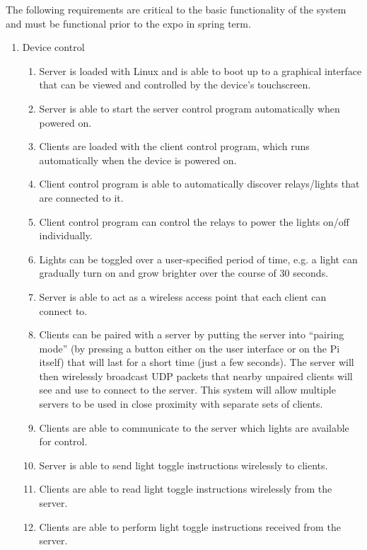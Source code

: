 \documentclass[12pt]{article}
\begin{document}
The following requirements are critical to the basic functionality of the
system and must be functional prior to the expo in spring term.

\begin{enumerate}
    \item Device control
        \begin{enumerate}
            \item Server is loaded with Linux and is able to boot up to a
                graphical interface that can be viewed and controlled by the
                device's touchscreen.
            \item Server is able to start the server control program
                automatically when powered on.
            \item Clients are loaded with the client control program, which
                runs automatically when the device is powered on.
            \item Client control program is able to automatically discover
                relays/lights that are connected to it.
            \item Client control program can control the relays to power the
                lights on/off individually.
            \item Lights can be toggled over a user-specified period of time,
                e.g. a light can gradually turn on and grow brighter over the
                course of 30 seconds.
            \item Server is able to act as a wireless access point that each
                client can connect to.
            \item Clients can be paired with a server by putting the server
                into ``pairing mode'' (by pressing a button either on the user
                interface or on the Pi itself) that will last for a short time
                (just a few seconds). The server will then wirelessly broadcast
                UDP packets that nearby unpaired clients will see and use to
                connect to the server. This system will allow multiple servers
                to be used in close proximity with separate sets of clients.
            \item Clients are able to communicate to the server which lights
                are available for control.
            \item Server is able to send light toggle instructions wirelessly
                to clients.
            \item Clients are able to read light toggle instructions wirelessly
                from the server.
            \item Clients are able to perform light toggle instructions
                received from the server.
        \end{enumerate}


\end{enumerate}
\end{document}
